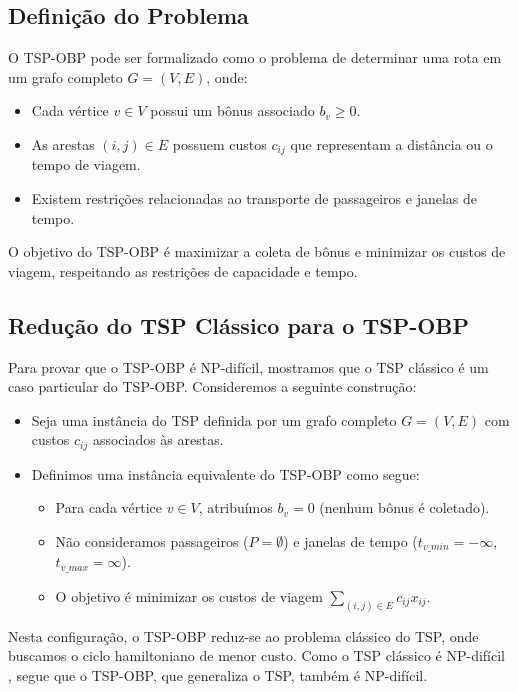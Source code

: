 \documentclass[12pt, a4paper]{report}
\begin{document}
\subsection{Definição do Problema}
O TSP-OBP pode ser formalizado como o problema de determinar uma rota em um grafo completo $G = (V, E)$, onde:
\begin{itemize}
    \item Cada vértice $v \in V$ possui um bônus associado $b_v \geq 0$.
    \item As arestas $(i, j) \in E$ possuem custos $c_{ij}$ que representam a distância ou o tempo de viagem.
    \item Existem restrições relacionadas ao transporte de passageiros e janelas de tempo.
\end{itemize}

O objetivo do TSP-OBP é maximizar a coleta de bônus e minimizar os custos de viagem, respeitando as restrições de capacidade e tempo.

\subsection{Redução do TSP Clássico para o TSP-OBP}
Para provar que o TSP-OBP é NP-difícil, mostramos que o TSP clássico é um caso particular do TSP-OBP. Consideremos a seguinte construção:
\begin{itemize}
    \item Seja uma instância do TSP definida por um grafo completo $G = (V, E)$ com custos $c_{ij}$ associados às arestas.
    \item Definimos uma instância equivalente do TSP-OBP como segue:
    \begin{itemize}
        \item Para cada vértice $v \in V$, atribuímos $b_v = 0$ (nenhum bônus é coletado).
        \item Não consideramos passageiros ($P = \emptyset$) e janelas de tempo ($t_{v\_min} = -\infty$, $t_{v\_max} = \infty$).
        \item O objetivo é minimizar os custos de viagem $\sum_{(i, j) \in E} c_{ij} x_{ij}$.
    \end{itemize}
\end{itemize}

Nesta configuração, o TSP-OBP reduz-se ao problema clássico do TSP, onde buscamos o ciclo hamiltoniano de menor custo. Como o TSP clássico é NP-difícil \cite{goldbarg2012}, segue que o TSP-OBP, que generaliza o TSP, também é NP-difícil.
\end{document}
